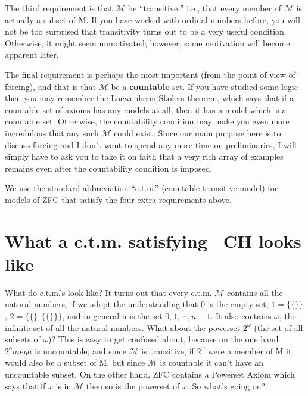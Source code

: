 \documentclass[10pt]{article}
\begin{document}
The third requirement is that $\mathcal{M}$ be ``transitive,'' i.e., that every member of $\mathcal M$ is actually a subset of M. If you have worked with ordinal numbers before, you will not be too surprised that transitivity turns out to be a very useful condition. Otherwise, it might seem unmotivated; however, some motivation will become apparent later.

The final requirement is perhaps the most important (from the point of view of forcing), and that is that $\mathcal{M}$ be a \textbf{countable} set. If you have studied some logic then you may remember the Loewenheim-Skolem theorem, which says that if a countable set of axioms has any models at all, then it has a model which is a countable set. Otherwise, the countability condition may make you even more incredulous that any such $\mathcal{M}$ could exist. Since our main purpose here is to discuss forcing and I don't want to spend any more time on preliminaries, I will simply have to ask you to take it on faith that a very rich array of examples remains even after the countability condition is imposed.

We use the standard abbreviation ``c.t.m.'' (countable transitive model) for models of ZFC that satisfy the four extra requirements above.


\section{What a c.t.m. satisfying ~CH looks like}

What do c.t.m.'s look like? It turns out that every c.t.m. $\mathcal{M}$ contains all the natural numbers, if we adopt the understanding that 0 is the empty set, $1 = \{\{\}\}$, $2 = \{\{\}, \{\{\}\}\}$, and in general n is the set ${0, 1, \cdots, n-1}$. It also contains $\omega$, the infinite set of all the natural numbers. What about the powerset $2^\omega$ (the set of all subsets of $\omega$)? This is easy to get confused about, because on the one hand $2^omega$ is uncountable, and since $\mathcal{M}$ is transitive, if $2^\omega$ were a member of M it would also be a subset of M, but since $\mathcal{M}$ is countable it can't have an uncountable subset. On the other hand, ZFC contains a Powerset Axiom which says that if $x$ is in $\mathcal M$ then so is the powerset of $x$. So what's going on?
\end{document}
